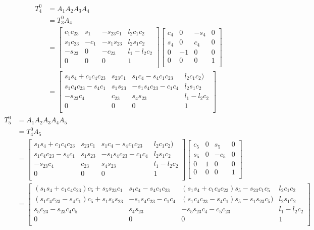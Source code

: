 \documentclass[fleqn,english,11pt,a4paper,landscape]{article}
\begin{document}
		\begin{align*}
			T^0_4 &= A_1A_2A_3A_4 \\
				  &= T^0_3A_4 \\
				  &= \begin{bmatrix}
		c_1c_{23}&s_1&-s_{23}c_1&l_2c_1c_2\\
		s_1c_{23}&-c_1&-s_1s_{23}&l_2s_1c_2\\
		-s_{23}&0&-c_{23}&l_1-l_2c_2\\
		0&0&0&1\\
		\end{bmatrix}\begin{bmatrix}
		 c_{4} & 0 & -s_{4} & 0\\
		 s_{4} & 0 & c_{4} & 0\\
		 0 & -1 & 0 & 0\\
		 0 & 0 & 0 & 1\\
		\end{bmatrix}\\
		&= \begin{bmatrix}
			s_1s_4 + c_1c_4c_{23}&s_{23}c_1&s_1c_4 - s_4c_1c_{23}&l_2c_1c_2)\\
			s_1c_4c_{23} - s_4c_1&s_1s_{23}&-s_1s_4c_{23} - c_1c_4&l_2s_1c_2\\
			-s_{23}c_4&c_{23}&s_4s_{23}&l_1 - l_2c_2\\
			0&0&0&1\\
		\end{bmatrix}
		\end{align*}
		\begin{align*}
			T^0_5 &= A_1A_2A_3A_4A_5 \\
				  &= T^0_4A_5 \\
				  &= \begin{bmatrix}
			s_1s_4 + c_1c_4c_{23}&s_{23}c_1&s_1c_4 - s_4c_1c_{23}&l_2c_1c_2)\\
			s_1c_4c_{23} - s_4c_1&s_1s_{23}&-s_1s_4c_{23} - c_1c_4&l_2s_1c_2\\
			-s_{23}c_4&c_{23}&s_4s_{23}&l_1 - l_2c_2\\
			0&0&0&1\\
		\end{bmatrix}\begin{bmatrix}
		 c_{5} & 0 & s_{5} & 0\\
		 s_{5} & 0 & -c_{5} & 0\\
		 0 & 1 & 0 & 0\\
		 0 & 0 & 0 & 1\\
		\end{bmatrix}\\
		&= \begin{bmatrix}
			(s_1s_4 + c_1c_4c_{23})c_5 + s_5s_{23}c_1&s_1c_4 - s_4c_1c_{23}&(s_1s_4 + c_1c_4c_{23})s_5 - s_{23}c_1c_5&l_2c_1c_2\\
			(s_1c_4c_{23} - s_4c_1)c_5 + s_1s_5s_{23}&-s_1s_4c_{23} - c_1c_4&(s_1c_4c_{23} - s_4c_1)s_5 - s_1s_{23}c_5)&l_2s_1c_2\\
			s_5c_{23} - s_{23}c_4c_5&s_4s_{23}&-s_5s_{23}c_4 - c_5c_{23}&l_1 - l_2c_2\\
			0&0&0&1\\
		\end{bmatrix}
		\end{align*}
		
\end{document}
